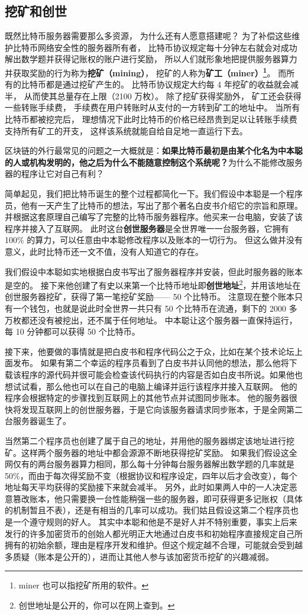 \subsection{挖矿和创世}
既然比特币服务器需要那么多资源， 为什么还有人愿意搭建呢？ 为了补偿这些维护比特币网络安全性的服务器所有者， 比特币协议规定每十分钟左右就会对成功解出数学题并获得记账权的账户进行奖励， 所以人们就形象地把提供服务器算力并获取奖励的行为称为\textbf{挖矿（mining）}， 挖矿的人称为\textbf{矿工（miner）\footnote{miner 也可以指挖矿所用的软件。}}。 而所有的比特币都是通过挖矿产生的。 比特币协议规定大约每 4 年挖矿的收益就会减半， 从而使其总量存在上限（2100 万枚）。 除了挖矿获得奖励外， 矿工还会获得一些转账手续费， 手续费在用户转账时从支付的一方转到矿工的地址中。 当所有比特币都被挖完后， 理想情况下此时比特币的价格已经昂贵到足以让转账手续费支持所有矿工的开支， 这样该系统就能自给自足地一直运行下去。

区块链的外行最常见的问题之一大概就是：\textbf{如果比特币最初是由某个化名为中本聪的人或机构发明的，他之后为什么不能随意控制这个系统呢？}为什么不能修改服务器的程序让它对自己有利？

简单起见，我们把比特币诞生的整个过程都简化一下。我们假设中本聪是一个程序员，他有一天产生了比特币的想法，写出了那个著名白皮书介绍它的宗旨和原理。并根据这套原理自己编写了完整的比特币服务器程序。他买来一台电脑，安装了该程序并接入了互联网。 此时这台\textbf{创世服务器}是全世界唯一一台服务器，它拥有 100\% 的算力，可以任意由中本聪修改程序以及账本的一切行为。 但这么做并没有意义，此时比特币还一文不值，没有人知道它的存在。

我们假设中本聪如实地根据白皮书写出了服务器程序并安装，但此时服务器的账本是空的。 接下来他创建了有史以来第一个比特币地址即\textbf{创世地址}\footnote{创世地址是公开的，你可以在网上查到。}，并用该地址在创世服务器挖矿，获得了第一笔挖矿奖励—— 50 个比特币。 注意现在整个账本只有一个钱包，也就是说此时全世界一共只有 50 个比特币在流通，剩下的 2000 多万枚都还没有被挖出，还不属于任何地址。 中本聪让这个服务器一直保持运行，每 10 分钟都可以获得 50 个比特币。

接下来，他要做的事情就是把白皮书和程序代码公之于众，比如在某个技术论坛上面发布。 如果有第二个幸运的程序员看到了白皮书并认同他的想法，那么他将下载该程序的源代码并很可能会检查该代码执行的内容是否如白皮书所说。如果他也想试试看，那么他也可以在自己的电脑上编译并运行该程序并接入互联网。 他的程序会根据特定的步骤找到互联网上的其他节点并试图同步账本。 他的服务器很快将发现互联网上的创世服务器，于是它向该服务器请求同步账本，于是全网第二台服务器诞生了。

当然第二个程序员也创建了属于自己的地址，并用他的服务器绑定该地址进行挖矿。这样两个服务器的地址中都会源源不断地获得挖矿奖励。 如果我们假设这全网仅有的两台服务器算力相同，那么每十分钟每台服务器解出数学题的几率就是 50\%，而由于每次得奖励不变（根据协议和程序设定，四年以后才会改变），每个地址每天平均获得的奖励接下来就会减半。 另外，此时如果两人中的一人决定恶意篡改账本，他只需要换一台性能稍强一些的服务器，即可获得更多记账权（具体的机制暂且不表），还是有相当的几率可以成功。我们姑且假设这第二个程序员也是一个遵守规则的好人。 其实中本聪和他是不是好人并不特别重要，事实上后来发行的许多加密货币的创始人都光明正大地通过白皮书和初始程序直接规定自己所拥有的初始余额，理由是程序开发和维护。但这个规定越不合理，可能就会受到越多质疑（账本是公开的），进而让其他人参与该加密货币挖矿的兴趣减弱。

